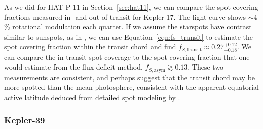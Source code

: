 As we did for HAT-P-11 in Section~\ref{sec:hat11}, we can compare the spot covering fractions measured in- and out-of-transit for Kepler-17. The \kepler light curve shows $\sim4$\% rotational modulation each quarter. If we assume the starspots have contrast similar to sunspots, as in \citet{Davenport2015thesis}, we can use Equation~\ref{eqn:fs_transit} to estimate the spot covering fraction within the transit chord and find $f_{S,\mathrm{transit}} \approx 0.27_{-0.18}^{+0.12}$. We can compare the in-transit spot coverage to the spot covering fraction that one would estimate from the flux deficit method, $f_{S, \mathrm{asym}} \gtrsim 0.13$. These two measurements are consistent, and perhaps suggest that the transit chord may be more spotted than the mean photosphere, consistent with the apparent equatorial active latitude deduced from detailed spot modeling by \citet{Davenport2015thesis}.

\subsubsection{Kepler-39} \label{sec:k39}

